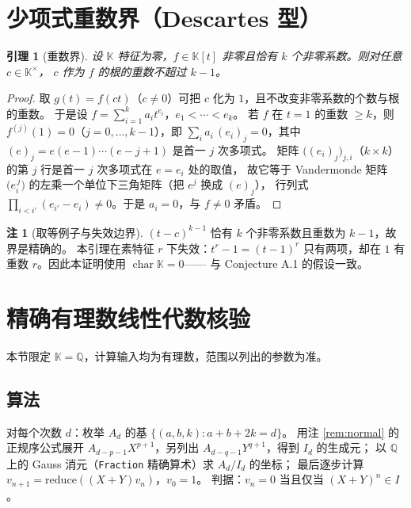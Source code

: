 \documentclass[11pt,UTF8]{ctexart}
\newtheorem{lemma}[theorem]{引理}
\theoremstyle{definition}
\newtheorem{remark}[theorem]{注}
\newcommand{\chr}{\operatorname{char}}
\newcommand{\Q}{\mathbb{Q}}
\newcommand{\K}{\mathbb{K}}
\begin{document}
\section{少项式重数界（Descartes 型）}\label{sec:fewnomial}

\begin{lemma}[重数界]\label{lem:fewnomial2}
设 $\K$ 特征为零，$f\in\K[t]$ 非零且恰有 $k$ 个非零系数。则对任意 $c\in\K^{\times}$，
$c$ 作为 $f$ 的根的重数不超过 $k-1$。
\end{lemma}

\begin{proof}
取 $g(t)=f(ct)$（$c\ne0$）可把 $c$ 化为 $1$，且不改变非零系数的个数与根的重数。
于是设 $f=\sum_{i=1}^{k}a_it^{e_i}$，$e_1<\cdots<e_k$。
若 $f$ 在 $t=1$ 的重数 $\ge k$，则 $f^{(j)}(1)=0$（$j=0,\dots,k-1$），即
$\sum_i a_i\,(e_i)_j=0$，其中 $(e)_j=e(e-1)\cdots(e-j+1)$ 是首一 $j$ 次多项式。
矩阵 $\bigl((e_i)_j\bigr)_{j,i}$（$k\times k$）的第 $j$ 行是首一 $j$ 次多项式在 $e=e_i$ 处的取值，
故它等于 Vandermonde 矩阵 $\bigl(e_i^{\,j}\bigr)$ 的左乘一个单位下三角矩阵（把 $e^j$ 换成 $(e)_j$），
行列式 $\prod_{i<i'}(e_{i'}-e_i)\ne0$。于是 $a_i=0$，与 $f\ne0$ 矛盾。
\end{proof}

\begin{remark}[取等例子与失效边界]
$(t-c)^{k-1}$ 恰有 $k$ 个非零系数且重数为 $k-1$，故界是精确的。
本引理在素特征 $r$ 下失效：$t^r-1=(t-1)^r$ 只有两项，却在 $1$ 有重数 $r$。因此本证明使用 $\chr\K=0$——
与 Conjecture A.1 的假设一致。
\end{remark}

\section{精确有理数线性代数核验}\label{sec:linear-algebra}

本节限定 $\K=\Q$，计算输入均为有理数，范围以列出的参数为准。

\subsection{算法}
对每个次数 $d$：枚举 $A_d$ 的基 $\{(a,b,k):a+b+2k=d\}$。
用注 \ref{rem:normal} 的正规序公式展开 $A_{d-p-1}X^{p+1}$，另列出 $A_{d-q-1}Y^{q+1}$，得到 $I_d$ 的生成元；
以 $\Q$ 上的 Gauss 消元（\texttt{Fraction} 精确算术）求 $A_d/I_d$ 的坐标；
最后逐步计算 $v_{n+1}=\mathrm{reduce}((X+Y)v_n)$，$v_0=1$。
判据：$v_n=0$ 当且仅当 $(X+Y)^n\in I$。
\end{document}
